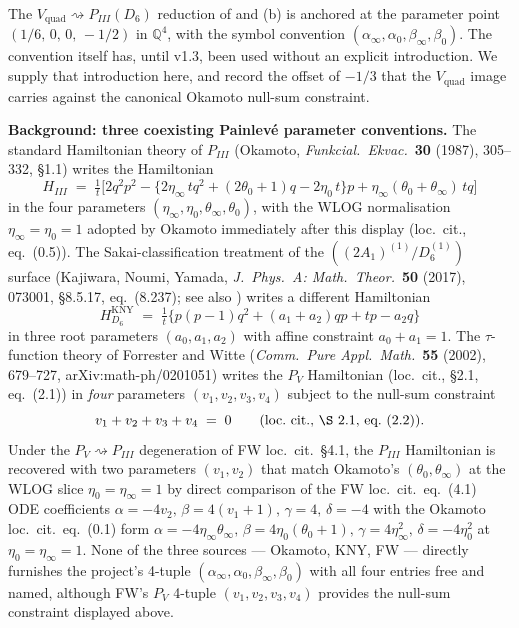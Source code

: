\documentclass[11pt,reqno]{amsart}
\theoremstyle{plain}
\theoremstyle{definition}
\theoremstyle{remark}
\newcommand{\Vquad}{V_{\mathrm{quad}}}
\begin{document}
The $\Vquad \rightsquigarrow P_{III}(D_6)$ reduction of
 and (b) is anchored at the
parameter point $(1/6,\,0,\,0,\,-1/2)$ in $\mathbb{Q}^4$, with
the symbol convention $(\alpha_\infty, \alpha_0, \beta_\infty,
\beta_0)$. The convention itself has, until v1.3, been used
without an explicit introduction. We supply that introduction
here, and record the offset of $-1/3$ that the $\Vquad$ image
carries against the canonical Okamoto null-sum constraint.

\medskip
\noindent\textbf{Background: three coexisting Painlev\'e
parameter conventions.}\hspace{0.5em}
The standard Hamiltonian theory of $P_{III}$ (Okamoto,
{\em Funkcial.\ Ekvac.}\ {\bf 30} (1987), 305--332, \S 1.1)
writes the Hamiltonian
\[
  H_{III} \;=\; \tfrac{1}{t}\bigl[2 q^{2} p^{2} -
       \{2 \eta_\infty\, t q^{2} + (2 \theta_0 + 1) q
       - 2 \eta_0\, t\}p
       + \eta_\infty(\theta_0 + \theta_\infty)\, t q\bigr]
\]
in the four parameters $(\eta_\infty, \eta_0, \theta_\infty,
\theta_0)$, with the WLOG normalisation
$\eta_\infty = \eta_0 = 1$ adopted by Okamoto immediately
after this display (loc.\ cit., eq.\ (0.5)). The
Sakai-classification treatment of the
$((2 A_1)^{(1)} / D_6^{(1)})$ surface (Kajiwara, Noumi, Yamada,
{\em J.\ Phys.\ A: Math.\ Theor.}\ {\bf 50} (2017), 073001,
\S 8.5.17, eq.\ (8.237); see also \cite{noumiyamada1998painleve,
ohyama2006studies, jimbomiwa1981monodromy}) writes a different
Hamiltonian
\[
  H_{D_6}^{\mathrm{KNY}} \;=\; \tfrac{1}{t}\bigl\{p(p-1) q^{2}
       + (a_1 + a_2) q p + t p - a_2 q\bigr\}
\]
in three root parameters $(a_0, a_1, a_2)$ with affine
constraint $a_0 + a_1 = 1$. The $\tau$-function theory of
Forrester and Witte ({\em Comm.\ Pure Appl.\ Math.}\
{\bf 55} (2002), 679--727, arXiv:math-ph/0201051) writes the
$P_V$ Hamiltonian (loc.\ cit., \S 2.1, eq.\ (2.1)) in {\em four}
parameters $(v_1, v_2, v_3, v_4)$ subject to the null-sum
constraint
\[
  v_1 + v_2 + v_3 + v_4 \;=\; 0
  \qquad\text{(loc.\ cit., \S 2.1, eq.\ (2.2))}.
\]
Under the $P_V \rightsquigarrow P_{III}$ degeneration of FW
loc.\ cit.\ \S 4.1, the $P_{III}$ Hamiltonian is recovered with
two parameters $(v_1, v_2)$ that match Okamoto's
$(\theta_0, \theta_\infty)$ at the WLOG slice
$\eta_0 = \eta_\infty = 1$ by direct comparison of the FW
loc.\ cit.\ eq.\ (4.1) ODE coefficients $\alpha = -4 v_2,\,
\beta = 4(v_1 + 1),\, \gamma = 4,\, \delta = -4$ with the
Okamoto loc.\ cit.\ eq.\ (0.1) form
$\alpha = -4 \eta_\infty \theta_\infty,\,
\beta = 4 \eta_0 (\theta_0 + 1),\, \gamma = 4 \eta_\infty^{2},\,
\delta = -4 \eta_0^{2}$ at $\eta_0 = \eta_\infty = 1$. None of
the three sources --- Okamoto, KNY, FW --- directly furnishes
the project's 4-tuple
$(\alpha_\infty, \alpha_0, \beta_\infty, \beta_0)$ with all
four entries free and named, although FW's $P_V$ 4-tuple
$(v_1, v_2, v_3, v_4)$ provides the null-sum constraint
displayed above.
\end{document}
